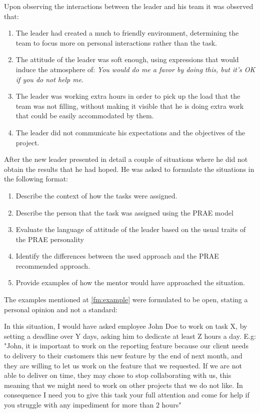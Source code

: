 Upon observing the interactions between the leader and his team it was observed that:
\begin{enumerate}
\item The leader had created a much to friendly environment, determining the team to focus more on personal interactions rather than the task.
\item The attitude of the leader was soft enough, using expressions that would induce the atmosphere of: \textit{You would do me a favor by doing this, but it's OK if you do not help me}.
\item The leader was working extra hours in order to pick up the load that the team was not filling, without making it visible that he is doing extra work that could be easily accommodated by them.
\item The leader did not communicate his expectations and the objectives of the project.
\end{enumerate}

After the new leader presented in detail a couple of situations where he did not obtain the results that he had hoped. He was asked to formulate the situations in the following format:
\begin{enumerate}
\item Describe the context of how the tasks were assigned.
\item Describe the person that the task was assigned using the PRAE model
\item Evaluate the language of attitude of the leader based on the usual traits of the PRAE personality
\item Identify the differences between the used approach and the PRAE recommended approach.
\item\label{fm:example} Provide examples of how the mentor would have approached the situation.
\end{enumerate}

The examples mentioned at \ref{fm:example} were formulated to be open, stating a personal opinion and not a standard:
\begin{displayquote}
In this situation, I would have asked employee John Doe to work on task X, by setting a deadline over Y days, asking him to dedicate at least Z hours a day.
E.g: "John, it is important to work on the reporting feature because our client needs to delivery to their customers this new feature by the end of next month, and they are willing to let us work on the feature that we requested. If we are not able to deliver on time, they may chose to stop collaborating with us, this meaning that we might need to work on other projects that we do not like. In consequence I need you to give this task your full attention and come for help if you struggle with any impediment for more than 2 hours"
\end{displayquote}

